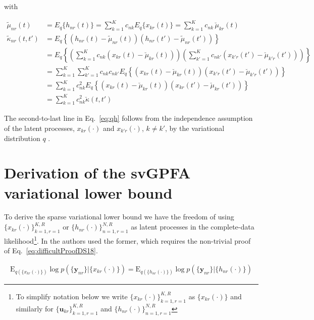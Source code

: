 \documentclass[12pt]{article}
\begin{document}
\noindent with

\begin{equation}
    \begin{aligned}
        \tilde{\mu}_{nr}(t)&=E_q\{h_{nr}(t)\}=\sum_{k=1}^Kc_{nk}E_q\{x_{kr}(t)\}=\sum_{k=1}^Kc_{nk}\,\breve\mu_{kr}(t)\\
        \tilde{\kappa}_{nr}(t,t')&=E_q\left\{\left(h_{nr}(t)-\tilde{\mu}_{nr}(t)\right)\left(h_{nr}(t')-\tilde{\mu}_{nr}(t')\right)\right\}\\
                                 &=E_q\left\{\left(\sum_{k=1}^Kc_{nk}(x_{kr}(t)-\breve\mu_{kr}(t))\right)\left(\sum_{k'=1}^Kc_{nk'}(x_{k'r}(t')-\breve\mu_{k'r}(t'))\right)\right\}\\
                                 &=\sum_{k=1}^K\sum_{k'=1}^Kc_{nk}c_{nk'}E_q\left\{(x_{kr}(t)-\breve\mu_{kr}(t))(x_{k'r}(t')-\breve\mu_{k'r}(t'))\right\}\\
                                 &=\sum_{k=1}^Kc_{nk}^2E_q\left\{(x_{kr}(t)-\breve\mu_{kr}(t))(x_{kr}(t')-\breve\mu_{kr}(t'))\right\}\\
                                 &=\sum_{k=1}^Kc_{nk}^2\breve\kappa(t,t')
    \end{aligned}
    \label{eq:qh}
\end{equation}

The second-to-last line in Eq.~\ref{eq:qh} follows from the independence
assumption of the latent processes, $x_{kr}(\cdot)$ and $x_{k'r}(\cdot)$, $k\ne
k'$, by the variational distribution $q$
\citep[][supplementary]{dunckerAndSahani18}.

\section{Derivation of the svGPFA variational lower bound}

To derive the sparse variational lower bound we have the freedom of using
$\{x_{kr}(\cdot)\}_{k=1,r=1}^{K,R}$ or $\{h_{nr}(\cdot)\}_{n=1,r=1}^{N,R}$ as
latent processes in the complete-data likelihood\footnote{To simplify notation below we write
$\{x_{kr}(\cdot)\}_{k=1,r=1}^{K,R}$ as $\{x_{kr}(\cdot)\}$ and similarly for $\{\mathbf{u}_{kr}\}_{k=1,r=1}^{K,R}$ and $\{h_{nr}(\cdot)\}_{n=1,r=1}^{N,R}$}. In
\cite[][supplementary]{dunckerAndSahani18} the authors used the former, which
requires the non-trivial proof of Eq.~\ref{eq:difficultProofDS18}.

\begin{align}
    \text{E}_{q(\{x_{kr}(\cdot)\})}\log p(\{\mathbf{y}_{nr}\}|\{x_{kr}(\cdot)\})=\text{E}_{q(\{h_{nr}(\cdot)\})}\log p(\{\mathbf{y}_{nr}\}|\{h_{nr}(\cdot)\})
    \label{eq:difficultProofDS18}
\end{align}
\end{document}
